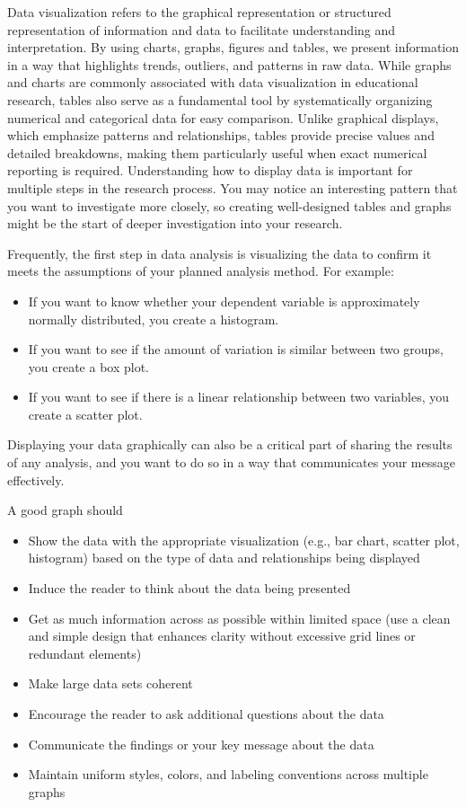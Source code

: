 \documentclass[
  letterpaper,
  DIV=11,
  numbers=noendperiod]{scrreprt}
\providecommand{\tightlist}{%
  \setlength{\itemsep}{0pt}\setlength{\parskip}{0pt}}
\begin{document}
Data visualization refers to the graphical representation or structured
representation of information and data to facilitate understanding and
interpretation. By using charts, graphs, figures and tables, we present
information in a way that highlights trends, outliers, and patterns in
raw data. While graphs and charts are commonly associated with data
visualization in educational research, tables also serve as a
fundamental tool by systematically organizing numerical and categorical
data for easy comparison. Unlike graphical displays, which emphasize
patterns and relationships, tables provide precise values and detailed
breakdowns, making them particularly useful when exact numerical
reporting is required. Understanding how to display data is important
for multiple steps in the research process. You may notice an
interesting pattern that you want to investigate more closely, so
creating well-designed tables and graphs might be the start of deeper
investigation into your research.

Frequently, the first step in data analysis is visualizing the data to
confirm it meets the assumptions of your planned analysis method. For
example:

\begin{itemize}
\item
  If you want to know whether your dependent variable is approximately
  normally distributed, you create a histogram.
\item
  If you want to see if the amount of variation is similar between two
  groups, you create a box plot.
\item
  If you want to see if there is a linear relationship between two
  variables, you create a scatter plot.
\end{itemize}

Displaying your data graphically can also be a critical part of sharing
the results of any analysis, and you want to do so in a way that
communicates your message effectively.

A good graph should

\begin{itemize}
\tightlist
\item
  Show the data with the appropriate visualization (e.g., bar chart,
  scatter plot, histogram) based on the type of data and relationships
  being displayed
\item
  Induce the reader to think about the data being presented
\item
  Get as much information across as possible within limited space (use a
  clean and simple design that enhances clarity without excessive grid
  lines or redundant elements)
\item
  Make large data sets coherent
\item
  Encourage the reader to ask additional questions about the data
\item
  Communicate the findings or your key message about the data
\item
  Maintain uniform styles, colors, and labeling conventions across
  multiple graphs
\end{itemize}
\end{document}
